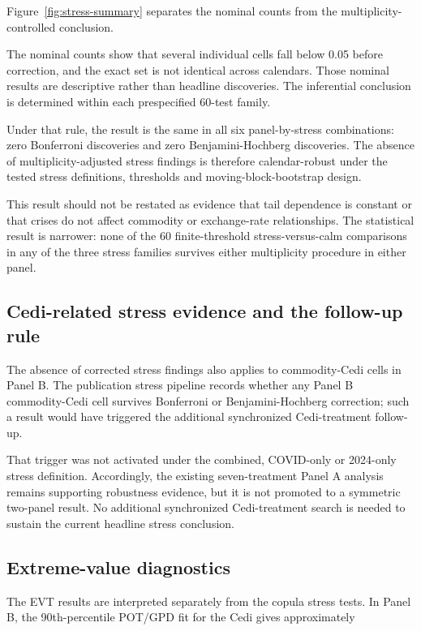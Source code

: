 Figure~\ref{fig:stress-summary} separates the nominal counts from the multiplicity-controlled conclusion.


The nominal counts show that several individual cells fall below 0.05 before correction, and the exact set is not identical across calendars. Those nominal results are descriptive rather than headline discoveries. The inferential conclusion is determined within each prespecified 60-test family.

Under that rule, the result is the same in all six panel-by-stress combinations: zero Bonferroni discoveries and zero Benjamini-Hochberg discoveries. The absence of multiplicity-adjusted stress findings is therefore calendar-robust under the tested stress definitions, thresholds and moving-block-bootstrap design.

This result should not be restated as evidence that tail dependence is constant or that crises do not affect commodity or exchange-rate relationships. The statistical result is narrower: none of the 60 finite-threshold stress-versus-calm comparisons in any of the three stress families survives either multiplicity procedure in either panel.

\subsection{Cedi-related stress evidence and the follow-up rule}

The absence of corrected stress findings also applies to commodity-Cedi cells in Panel B. The publication stress pipeline records whether any Panel B commodity-Cedi cell survives Bonferroni or Benjamini-Hochberg correction; such a result would have triggered the additional synchronized Cedi-treatment follow-up.

That trigger was not activated under the combined, COVID-only or 2024-only stress definition. Accordingly, the existing seven-treatment Panel A analysis remains supporting robustness evidence, but it is not promoted to a symmetric two-panel result. No additional synchronized Cedi-treatment search is needed to sustain the current headline stress conclusion.

\subsection{Extreme-value diagnostics}

The EVT results are interpreted separately from the copula stress tests. In Panel B, the 90th-percentile POT/GPD fit for the Cedi gives approximately

